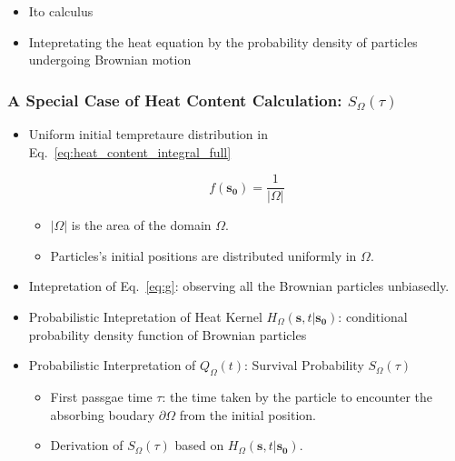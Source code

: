 
        \begin{itemize}
          \item Ito calculus
          \item Intepretating the heat equation by the probability density of particles undergoing Brownian motion
        \end{itemize}
        

    \subsubsection{A Special Case of Heat Content Calculation: $S_{\Omega}(\tau)$}

      \begin{itemize}    
        \item Uniform initial tempretaure distribution in Eq.~\ref{eq:heat_content_integral_full}
          \par
          \begin{equation}\label{eq:uniform_initial_condition}
             f(\bm{s_0}) = \frac{1}{|\Omega|} 
          \end{equation}

          \begin{itemize}
            \item $|\Omega|$ is the area of the domain $\Omega$.
            \item Particles's initial positions are distributed uniformly in $\Omega$.
          \end{itemize}
          
        \item Intepretation of Eq.~\ref{eq:g}: observing all the Brownian particles unbiasedly.
           
        \item Probabilistic Intepretation of Heat Kernel $H_{\Omega}(\bm{s}, t | \bm{s_0})$: conditional probability density function of Brownian particles

        \item Probabilistic Interpretation of $Q_{\Omega}(t)$: Survival Probability $S_{\Omega}(\tau)$
          \begin{itemize}
            \item First passgae time $\tau$: the time taken by the particle to encounter the absorbing boudary $\partial \Omega$ from the initial position.
            \item Derivation of $S_{\Omega}(\tau)$ based on $H_{\Omega}(\bm{s}, t | \bm{s_0})$.
          \end{itemize}
      \end{itemize}
      


